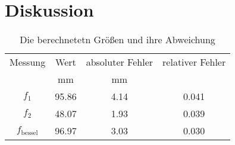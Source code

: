 \section{Diskussion}
\label{sec:Diskussion}
\begin{table}
    \centering
    \begin{tabular}{c | c c c }
        \toprule
        Messung & Wert &  absoluter Fehler & relativer Fehler\\
         & mm & mm & \\
        \midrule
        $f_1$ & 95.86 & 4.14 & 0.041\\
        $f_2$ & 48.07 & 1.93 & 0.039\\
        $f_{\text{bessel}} $& 96.97 & 3.03 & 0.030\\
        \bottomrule
    \end{tabular}
    \caption{Die berechnetetn Größen und ihre Abweichung}
    \label{tab:tab1}
\end{table}
